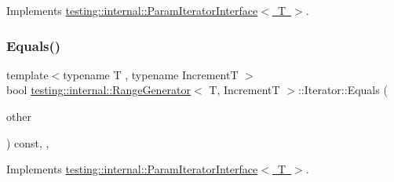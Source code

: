 Implements \mbox{\hyperlink{classtesting_1_1internal_1_1_param_iterator_interface_a9d811697a752d46f7bd6a0082f9040a3}{testing\+::internal\+::\+Param\+Iterator\+Interface$<$ T $>$}}.

\mbox{\label{classtesting_1_1internal_1_1_range_generator_1_1_iterator_a534406abbddb137d7672c2b53d5bff0b}} 
\subsubsection{\texorpdfstring{Equals()}{Equals()}\hspace{0.1cm}{\footnotesize\ttfamily [2/3]}}
{\footnotesize\ttfamily template$<$typename T , typename IncrementT $>$ \\
bool \mbox{\hyperlink{classtesting_1_1internal_1_1_range_generator}{testing\+::internal\+::\+Range\+Generator}}$<$ T, IncrementT $>$\+::Iterator\+::\+Equals (\begin{DoxyParamCaption}\item[{const \mbox{\hyperlink{classtesting_1_1internal_1_1_param_iterator_interface}{Param\+Iterator\+Interface}}$<$ T $>$ \&}]{other }\end{DoxyParamCaption}) const\hspace{0.3cm}{\ttfamily [inline]}, {\ttfamily [override]}, {\ttfamily [virtual]}}



Implements \mbox{\hyperlink{classtesting_1_1internal_1_1_param_iterator_interface_a9d811697a752d46f7bd6a0082f9040a3}{testing\+::internal\+::\+Param\+Iterator\+Interface$<$ T $>$}}.

\mbox{\label{classtesting_1_1internal_1_1_range_generator_1_1_iterator_a534406abbddb137d7672c2b53d5bff0b}} 
